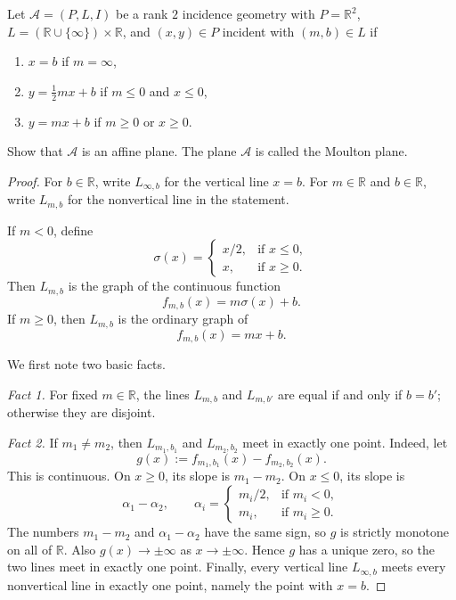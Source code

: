 \documentclass[11pt, a4paper]{ctexrep}
\begin{document}
\begin{exercise}
    Let $\mathcal{A}=(P,L,I)$ be a rank $2$ incidence geometry with $P=\mathbb{R}^2$,
    $L=(\mathbb{R}\cup \{\infty\})\times \mathbb{R}$, and $(x,y)\in P$ incident with $(m,b)\in L$ if
    \begin{enumerate}
        \item[(a)] $x=b$ if $m=\infty$,
        \item[(b)] $y=\frac{1}{2}mx+b$ if $m\le 0$ and $x\le 0$,
        \item[(c)] $y=mx+b$ if $m\ge 0$ or $x\ge 0$.
    \end{enumerate}
    Show that $\mathcal{A}$ is an affine plane. The plane $\mathcal{A}$ is called the Moulton plane.
\end{exercise}

\begin{proof}
    For \(b\in \mathbb{R}\), write \(L_{\infty,b}\) for the vertical line \(x=b\). For \(m\in\mathbb{R}\) and
    \(b\in\mathbb{R}\), write \(L_{m,b}\) for the nonvertical line in the statement.

    If \(m<0\), define
    \[
        \sigma(x)=
        \begin{cases}
            x/2, & \text{if } x\le 0, \\
            x,   & \text{if } x\ge 0.
        \end{cases}
    \]
    Then \(L_{m,b}\) is the graph of the continuous function
    \[
        f_{m,b}(x)=m\sigma(x)+b.
    \]
    If \(m\ge 0\), then \(L_{m,b}\) is the ordinary graph of
    \[
        f_{m,b}(x)=mx+b.
    \]

    We first note two basic facts.

    \smallskip
    \noindent\emph{Fact 1.} For fixed \(m\in\mathbb{R}\), the lines \(L_{m,b}\) and \(L_{m,b'}\) are equal if
    and only if \(b=b'\); otherwise they are disjoint.

    \smallskip
    \noindent\emph{Fact 2.} If \(m_1\ne m_2\), then \(L_{m_1,b_1}\) and \(L_{m_2,b_2}\) meet in exactly one point.
    Indeed, let
    \[
        g(x):=f_{m_1,b_1}(x)-f_{m_2,b_2}(x).
    \]
    This is continuous. On \(x\ge 0\), its slope is \(m_1-m_2\). On \(x\le 0\), its slope is
    \[
        \alpha_1-\alpha_2,
        \qquad
        \alpha_i=
        \begin{cases}
            m_i/2, & \text{if } m_i<0, \\
            m_i,   & \text{if } m_i\ge 0.
        \end{cases}
    \]
    The numbers \(m_1-m_2\) and \(\alpha_1-\alpha_2\) have the same sign, so \(g\) is strictly monotone on
    all of \(\mathbb{R}\). Also \(g(x)\to\pm\infty\) as \(x\to\pm\infty\). Hence \(g\) has a unique zero, so
    the two lines meet in exactly one point. Finally, every vertical line \(L_{\infty,b}\) meets every
    nonvertical line in exactly one point, namely the point with \(x=b\).


\end{proof}
\end{document}
